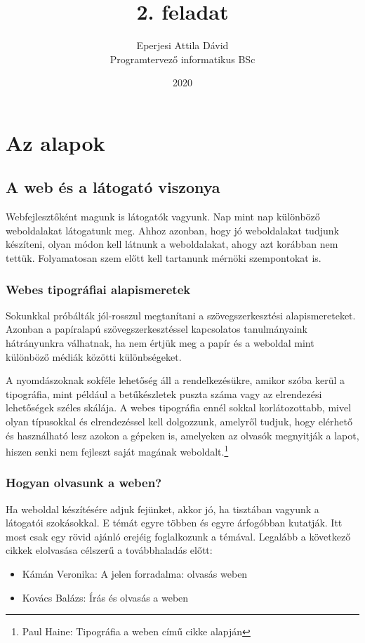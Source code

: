 \documentclass{thesis-ekf}
\theoremstyle{definition}
\begin{document}
	\title{2. feladat}
	\author{Eperjesi Attila Dávid\\Programtervező informatikus BSc}
	\date{2020}

	\maketitle
	\tableofcontents
	\chapter{Az alapok}
	\section{A web és a látogató viszonya}
	Webfejlesztőként magunk is látogatók vagyunk. Nap mint nap különböző weboldalakat látogatunk meg. Ahhoz azonban, hogy jó weboldalakat tudjunk készíteni, olyan módon kell látnunk a weboldalakat, ahogy azt korábban nem tettük. Folyamatosan szem előtt kell tartanunk mérnöki szempontokat is.
	\subsection{Webes tipográfiai alapismeretek}
	Sokunkkal próbálták jól-rosszul megtanítani a szövegszerkesztési alapismereteket. Azonban a papíralapú szövegszerkesztéssel kapcsolatos tanulmányaink hátrányunkra válhatnak, ha nem értjük meg a papír és a weboldal mint különböző médiák közötti különbségeket.
	
	A nyomdászoknak sokféle lehetőség áll a rendelkezésükre, amikor szóba kerül a tipográfia, mint például a betűkészletek puszta száma vagy az elrendezési lehetőségek széles skálája. A webes tipográfia ennél sokkal korlátozottabb, mivel olyan típusokkal és elrendezéssel kell dolgozzunk, amelyről tudjuk, hogy elérhető és használható lesz azokon a gépeken is, amelyeken az olvasók megnyitják a lapot, hiszen senki nem fejleszt saját magának weboldalt.\footnote{Paul Haine: Tipográfia a weben című cikke alapján}
	\subsection{Hogyan olvasunk a weben?}
	Ha weboldal készítésére adjuk fejünket, akkor jó, ha tisztában vagyunk a látogatói szokásokkal. E témát egyre többen és egyre árfogóbban kutatják. Itt most csak egy rövid ajánló erejéig foglalkozunk a témával. Legalább a következő cikkek elolvasása célszerű a továbbhaladás előtt:
	\begin{itemize}
		\item Kámán Veronika: A jelen forradalma: olvasás weben
		\item Kovács Balázs: Írás és olvasás a weben
	\end{itemize}
\end{document}
